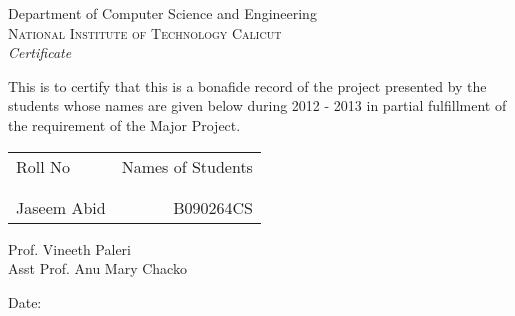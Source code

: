 \newpage
\thispagestyle{empty}

\begin{center}

\huge{Department of Computer Science and Engineering}\\[0.5cm]
\normalsize
\textsc{National Institute of Technology Calicut}\\[2.0cm]

\emph{\LARGE Certificate}\\[2.5cm]
\end{center}
\normalsize
This is to certify that this is a bonafide record of the project presented by
the students whose names are given below during 2012 - 2013 in partial
fulfillment of the requirement
of the Major Project.\\[1.0cm]

\begin{table}[h]
\centering
\begin{tabular}{lr}
Roll No & Names of Students \\ \\ \hline
\\
Jaseem Abid & B090264CS


\end{tabular}
\end{table}

\vfill


\begin{flushright}
Prof. Vineeth Paleri\\ [1.5cm]
Asst Prof. Anu Mary Chacko \\
\end{flushright}

\begin{flushleft}
Date:
\end{flushleft}
